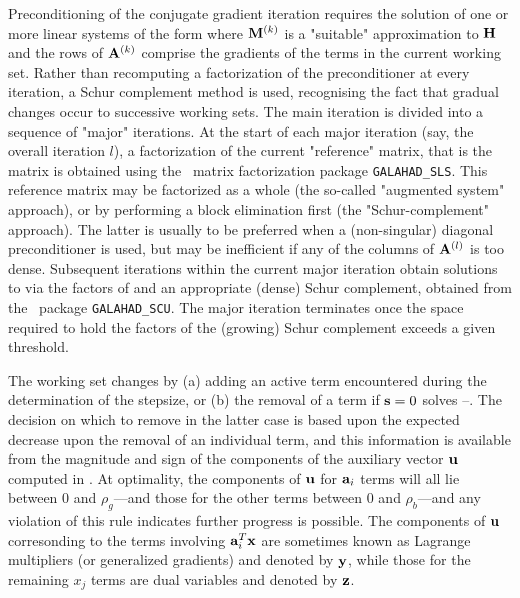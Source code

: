 \documentclass{galahad}
\begin{document}
Preconditioning of the conjugate gradient iteration
requires the solution of one or more linear systems of the form
where ${\mathbf{M}}^{(k)}$ is a "suitable" approximation to ${\mathbf{H}}$
and the rows of ${\mathbf{A}}^{(k)}$ comprise the gradients of the
terms in the current working set. Rather than recomputing a
factorization of the preconditioner at every iteration, a
Schur complement method is used, recognising the fact that
gradual changes occur to successive working sets. The main
iteration is divided into a sequence of "major" iterations.
At the start of each major iteration (say, the overall iteration $l$), 
a factorization of the
current "reference" matrix, that is the matrix
is obtained using the \galahad\ matrix factorization package 
{\tt GALAHAD\_SLS}.
This reference matrix may be factorized as a whole (the so-called 
"augmented system" approach), or by performing a block elimination first 
(the "Schur-complement" approach). The latter is usually to be preferred 
when a (non-singular) diagonal 
preconditioner is used, but may be inefficient if any of the columns
of ${\mathbf{A}}^{(l)}$ is too dense.
Subsequent iterations within the current major
iteration obtain solutions to  via the factors of 
and an appropriate (dense) Schur complement,
obtained from the \galahad\ package {\tt GALAHAD\_SCU}.
The major iteration terminates
once the space required to hold the factors of the (growing) Schur
complement exceeds a given threshold.

The working set changes by (a) adding an active term encountered during 
the determination of the stepsize, or (b) the removal of a term if ${\mathbf{s}} = 0$
solves --. The  decision on which to remove in the latter 
case is based upon the expected decrease upon the removal of an individual term,
and this information is available from the magnitude and sign of the components
of the auxiliary vector ${\mathbf{u}}$ computed in . At optimality, the
components of ${\mathbf{u}}$ for ${\mathbf{a}}_i$ terms will all lie between 
$0$ and $\rho_g$---and those for the other terms 
between $0$ and $\rho_b$---and any violation
of this rule indicates further progress is possible. The components
of ${\mathbf{u}}$ corresonding to the terms involving ${\mathbf{a}}_i^T {\mathbf{x}}$
are sometimes known as Lagrange multipliers (or generalized gradients) and
denoted by ${\mathbf{y}}$, while those for the remaining $x_j$ terms are dual variables
and denoted by ${\mathbf{z}}$.
\end{document}
